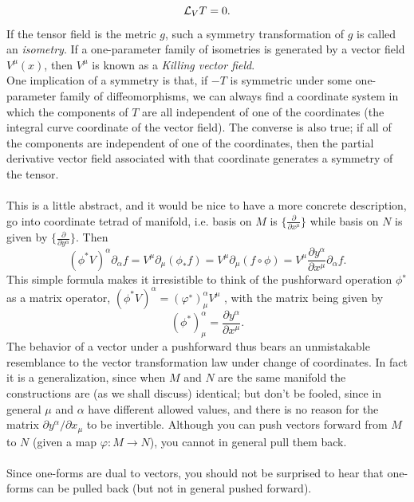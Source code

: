 \begin{equation}
	\mathcal{L}_V T=0.
\end{equation}
If the tensor field is the metric $g$, such a symmetry transformation of $g$ is called an \emph{isometry}. If a one-parameter family of isometries
is generated by a vector field $V^μ (x)$, then $V^μ$ is known as a \emph{Killing vector field}.\\
One implication of a symmetry is that, if $-T$ is symmetric under some one-parameter
family of diffeomorphisms, we can always find a coordinate system in which the components
of $T$ are all independent of one of the coordinates (the integral curve coordinate of the
vector field). The converse is also true; if all of the components are independent of one
of the coordinates, then the partial derivative vector field associated with that coordinate
generates a symmetry of the tensor.
\\
\\
This is a little abstract, and it would be nice to have a more concrete description, go into coordinate tetrad of manifold, i.e. basis on $M$ is $\{\frac{\partial }{\partial x^\mu} \}$ while basis on $N$ is given by $\{\frac{\partial}{\partial y^\alpha}	\}$. Then
\begin{equation}
	(\phi^* V )^α ∂_α f = V^μ ∂_μ (\phi_* f ) =  V^μ ∂_μ (f \circ \phi) = V^\mu \frac{\partial y^\alpha}{\partial x^\mu} \partial_\alpha f.
\end{equation}
This simple formula makes it irresistible to think of the pushforward operation $\phi^∗$ as a matrix
operator, $(\phi^* V )^α = (φ^∗ )^α_μ V^μ$ , with the matrix being given by
\begin{equation}
	(\phi^*)^\alpha_\mu = \frac{\partial y^\alpha}{\partial x^\mu}.
\end{equation}
The behavior of a vector under a pushforward thus bears an unmistakable resemblance to the
vector transformation law under change of coordinates. In fact it is a generalization, since
when $M$ and $N$ are the same manifold the constructions are (as we shall discuss) identical;
but don’t be fooled, since in general $μ$ and $α$ have different allowed values, and there is no
reason for the matrix $∂y^α /∂x_μ$ to be invertible.
Although you can push vectors forward
from $M$ to $N$ (given a map $φ : M → N$), you cannot in general pull them back. 
\\
\\
Since one-forms are dual to vectors, you should not be surprised to hear that one-forms can
be pulled back (but not in general pushed forward).
